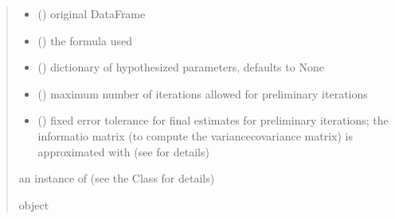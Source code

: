 \documentclass[letterpaper,10pt,english]{sphinxmanual}
\begin{document}
\begin{fulllineitems}
\begin{quote}
\begin{description}
\begin{itemize}
\item {} 
\sphinxAtStartPar
{} () \textendash{} original DataFrame

\item {} 
\sphinxAtStartPar
{} () \textendash{} the formula used

\item {} 
\sphinxAtStartPar
{} (\sphinxstyleliteralemphasis{\sphinxupquote{, }}) \textendash{} dictionary of hypothesized parameters, defaults to None

\item {} 
\sphinxAtStartPar
{} () \textendash{} maximum number of iterations allowed for preliminary iterations

\item {} 
\sphinxAtStartPar
{} () \textendash{} fixed error tolerance for final estimates for preliminary iterations;
the informatio matrix (to compute the variance\sphinxhyphen{}covariance matrix) is approximated with 
(see  for details)

\end{itemize}

\sphinxAtStartPar
an instance of  (see the Class for details)

\sphinxAtStartPar
object

\end{description}\end{quote}

\end{fulllineitems}

\end{document}
